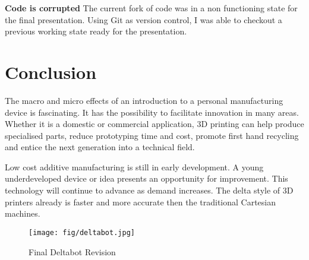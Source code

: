 \documentclass[a4paper, 11pt, twoside]{Thesis}  %
\begin{document}
 \textbf{Code is corrupted} The current fork of code was in a non functioning state for the final presentation. Using Git as version control, I was able to checkout a previous working state ready for the presentation.



\chapter{Conclusion}
\label{Conclusion}

The macro and micro effects of an introduction to a personal manufacturing device is fascinating. It has the possibility to facilitate innovation in many areas. 
Whether it is a domestic or commercial application, 3D printing can help produce specialised parts, reduce prototyping time and cost, promote first hand recycling and entice the next generation into a technical field.

Low cost additive manufacturing is still in early development. A young underdeveloped device or idea presents an opportunity for improvement. This technology will continue to advance as demand increases. The delta style of 3D printers already is faster and more accurate then the traditional Cartesian machines.



\begin{figure}[H]
\centering%
\texttt{[image: fig/deltabot.jpg]}
\caption{Final Deltabot Revision}
\label{fig:deltabot.jpg}
\end{figure}
\end{document}
